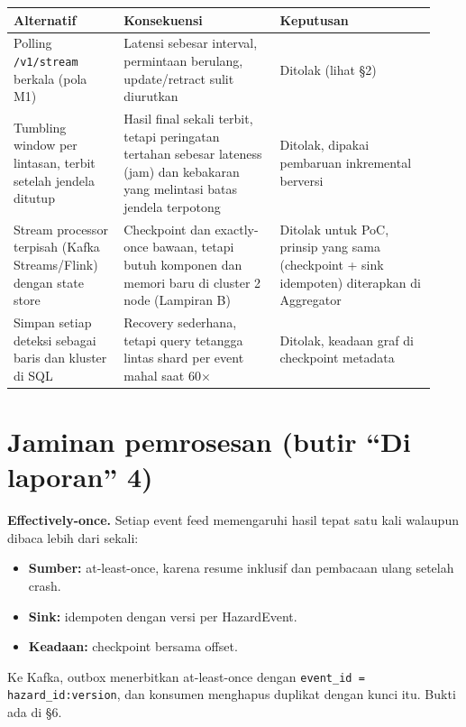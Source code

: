 {\small
\begin{longtable}{@{}>{\raggedright\arraybackslash}p{0.248\linewidth}>{\raggedright\arraybackslash}p{0.343\linewidth}>{\raggedright\arraybackslash}p{0.343\linewidth}@{}}
\toprule
\textbf{Alternatif} & \textbf{Konsekuensi} & \textbf{Keputusan} \\
\midrule
\endhead
Polling \texttt{/\allowbreak{}v1/\allowbreak{}stream} berkala (pola M1) & Latensi sebesar interval, permintaan berulang, update/retract sulit diurutkan & Ditolak (lihat §2) \\
Tumbling window per lintasan, terbit setelah jendela ditutup & Hasil final sekali terbit, tetapi peringatan tertahan sebesar lateness (jam) dan kebakaran yang melintasi batas jendela terpotong & Ditolak, dipakai pembaruan inkremental berversi \\
Stream processor terpisah (Kafka Streams/Flink) dengan state store & Checkpoint dan exactly-once bawaan, tetapi butuh komponen dan memori baru di cluster 2 node (Lampiran B) & Ditolak untuk PoC, prinsip yang sama (checkpoint + sink idempoten) diterapkan di Aggregator \\
Simpan setiap deteksi sebagai baris dan kluster di SQL & Recovery sederhana, tetapi query tetangga lintas shard per event mahal saat 60$\times$ & Ditolak, keadaan graf di checkpoint metadata \\
\bottomrule
\end{longtable}
}

\section{Jaminan pemrosesan (butir ``Di laporan'' 4)}

\textbf{Effectively-once.} Setiap event feed memengaruhi hasil tepat satu kali walaupun dibaca lebih dari sekali:

\begin{itemize}
\item \textbf{Sumber:} at-least-once, karena resume inklusif dan pembacaan ulang setelah crash.
\item \textbf{Sink:} idempoten dengan versi per HazardEvent.
\item \textbf{Keadaan:} checkpoint bersama offset.
\end{itemize}

Ke Kafka, outbox menerbitkan at-least-once dengan \texttt{event\_\allowbreak{}id =\allowbreak{} hazard\_\allowbreak{}id:version}, dan konsumen menghapus duplikat dengan kunci itu. Bukti ada di §6.



